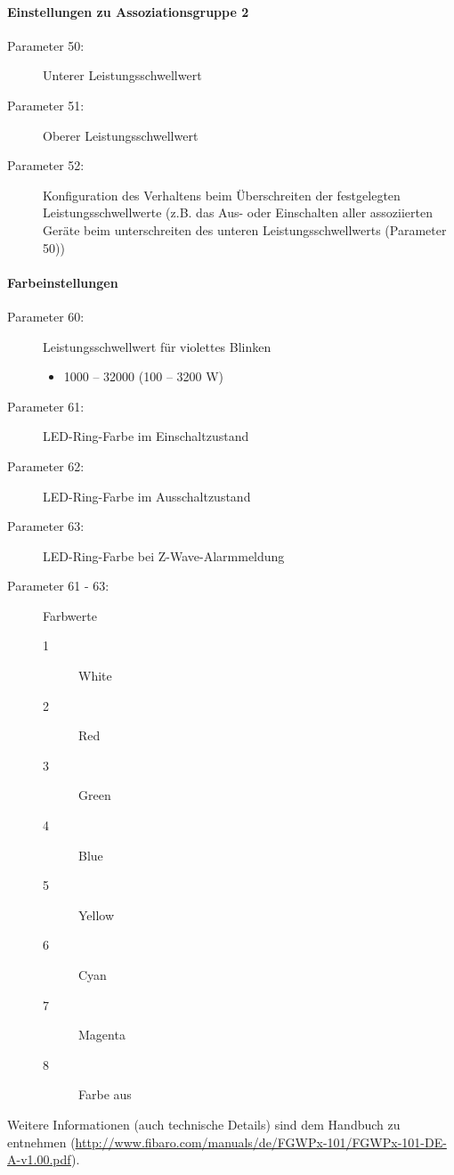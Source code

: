 \paragraph{Einstellungen zu Assoziationsgruppe 2}
\begin{description}
	\item [Parameter 50:] Unterer Leistungsschwellwert
	\item [Parameter 51:] Oberer Leistungsschwellwert
	\item [Parameter 52:] Konfiguration des Verhaltens beim Überschreiten der festgelegten Leistungsschwellwerte (z.B. das Aus- oder Einschalten aller assoziierten Geräte beim unterschreiten des unteren Leistungsschwellwerts (Parameter 50))
\end{description}

\paragraph{Farbeinstellungen}
\begin{description}
	\item[Parameter 60:] Leistungsschwellwert für violettes Blinken
	\begin{itemize}
		\item 1000 – 32000 (100 – 3200 W)
	\end{itemize}
	\item [Parameter 61:] LED-Ring-Farbe im Einschaltzustand
	\item [Parameter 62:] LED-Ring-Farbe im Ausschaltzustand
	\item [Parameter 63:] LED-Ring-Farbe bei Z-Wave-Alarmmeldung
	\item [Parameter 61 - 63:] Farbwerte
	\begin{description}
		\item [1] White
		\item [2] Red
		\item [3] Green
		\item [4] Blue
		\item [5] Yellow
		\item [6] Cyan
		\item [7] Magenta
		\item [8] Farbe aus
	\end{description}
\end{description}
Weitere Informationen (auch technische Details) sind dem Handbuch zu entnehmen (\url{http://www.fibaro.com/manuals/de/FGWPx-101/FGWPx-101-DE-A-v1.00.pdf}).

\newpage
